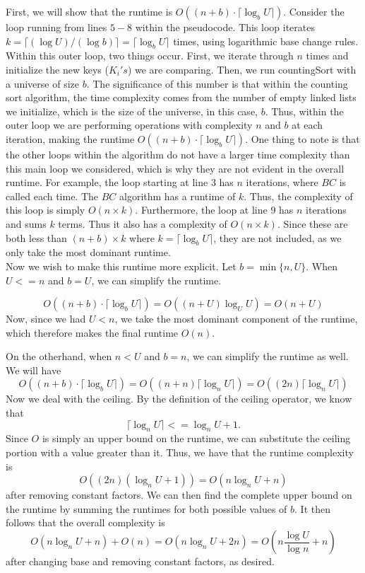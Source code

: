 \documentclass[11pt]{article}
\begin{document}
\begin{enumerate}
\begin{enumerate}
            First, we will show that the runtime is $O((n+b)\cdot \lceil \log_b U\rceil)$. Consider the loop running from lines $5-8$ within the pseudocode. This loop iterates $k=\lceil (\log U)/(\log b)\rceil = \lceil \log_b U \rceil$ times, using logarithmic base change rules. Within this outer loop, two things occur. First, we iterate through $n$ times and initialize the new keys ($K_i's$) we are comparing. Then, we run countingSort with a universe of size $b$. The significance of this number is that within the counting sort algorithm, the time complexity comes from the number of empty linked lists we initialize, which is the size of the universe, in this case, $b$. Thus, within the outer loop we are performing operations with complexity $n$ and $b$ at each iteration, making the runtime $O((n+b)\cdot \lceil \log_b U\rceil)$. One thing to note is that the other loops within the algorithm do not have a larger time complexity than this main loop we considered, which is why they are not evident in the overall runtime. For example, the loop starting at line 3 has $n$ iterations, where $BC$ is called each time. The $BC$ algorithm has a runtime of $k$. Thus, the complexity of this loop is simply $O(n \times k)$. Furthermore, the loop at line $9$ has $n$ iterations and sums $k$ terms. Thus it also has a complexity of $O(n \times k)$. Since these are both less than $(n+b) \times k$ where $k=\lceil \log_b U\rceil$, they are not included, as we only take the most dominant runtime. \\
            
            Now we wish to make this runtime more explicit. Let $b=\min\{n, U\}$. When $U <= n$ and $b = U$, we can simplify the runtime.
            
            $$
            O((n+b)\cdot \lceil \log_b U\rceil) = O((n+U) \log_U U) = O(n+U)
            $$
            Now, since we had $U < n$, we take the most dominant component of the runtime, which therefore makes the final runtime $O(n)$. 
            
            On the otherhand, when $n < U$ and $b = n$, we can simplify the runtime as well. We will have 
            $$
            O((n+b)\cdot \lceil \log_b U\rceil) = O((n+n) \lceil \log_n U \rceil) = O((2n) \lceil \log_n U \rceil)
            $$
            Now we deal with the ceiling. By the definition of the ceiling operator, we know that $$\lceil \log_n U \rceil <= \log_n U + 1.$$ Since $O$ is simply an upper bound on the runtime, we can substitute the ceiling portion with a value greater than it. Thus, we have that the runtime complexity is $$ O((2n) (\log_n U + 1)) = O(n \log_n U + n)$$ after removing constant factors. We can then find the complete upper bound on the runtime by summing the runtimes for both possible values of $b$. It then follows that the overall complexity is
            $$
            O(n \log_n U + n) + O(n) = O(n \log_n U + 2n) = O(n \frac{\log U}{\log n} + n)
            $$ after changing base and removing constant factors, as desired. 
            

\end{enumerate}
\end{enumerate}
\end{document}
